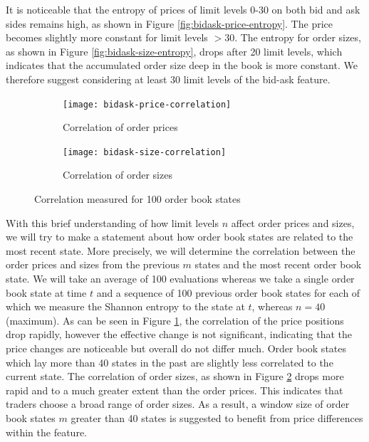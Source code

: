 It is noticeable that the entropy of prices of limit levels 0-30 on both bid and ask sides remains high, as shown in Figure \ref{fig:bidask-price-entropy}. 
The price becomes slightly more constant for limit levels $>30$. 
The entropy for order sizes, as shown in Figure \ref{fig:bidask-size-entropy}, drops after 20 limit levels, which indicates that the accumulated order size deep in the book is more constant. 
We therefore suggest considering at least 30 limit levels of the bid-ask feature.

\begin{figure}[H]
    \centering
    \begin{subfigure}[b]{0.45\textwidth}
        \texttt{[image: bidask-price-correlation]}
        \caption{Correlation of order prices}
        \label{fig:bidask-price-correlation}
    \end{subfigure}
    \begin{subfigure}[b]{0.45\textwidth}
        \texttt{[image: bidask-size-correlation]}
        \caption{Correlation of order sizes}
        \label{fig:bidask-size-correlation}
    \end{subfigure}
    \caption{Correlation measured for 100 order book states}\label{fig:bidask-correlation}
\end{figure}

With this brief understanding of how limit levels $n$ affect order prices and sizes, we will try to make a statement about how order book states are related to the most recent state.
More precisely, we will determine the correlation between the order prices and sizes from the previous $m$ states and the most recent order book state.
We will take an average of 100 evaluations whereas we take a single order book state at time $t$ and a sequence of 100 previous order book states for each of which we measure the Shannon entropy\cite{shannon2001mathematical} to the state at $t$, whereas $n=40$ (maximum).
As can be seen in Figure \ref{fig:bidask-price-correlation}, the correlation of the price positions drop rapidly, however the effective change is not significant, indicating that the price changes are noticeable but overall do not differ much.
Order book states which lay more than 40 states in the past are slightly less correlated to the current state.
The correlation of order sizes, as shown in Figure \ref{fig:bidask-size-correlation} drops more rapid and to a much greater extent than the order prices.
This indicates that traders choose a broad range of order sizes.
As a result, a window size of order book states $m$ greater than 40 states is suggested to benefit from price differences within the feature.

